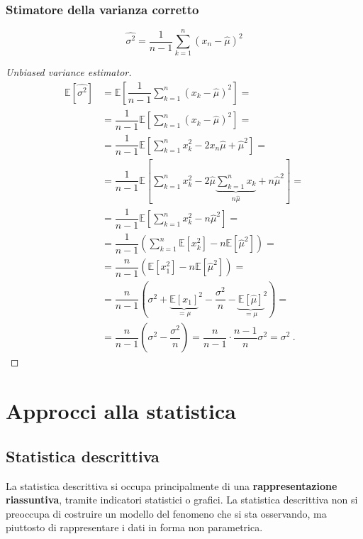 \subsection{Stimatore della varianza corretto}
\begin{equation}
    \widehat{\sigma^2} = \dfrac{1}{n-1} \sum_{k=1}^{n} ( x_n - \hat{\mu} )^2
\end{equation}
\begin{proof}[Unbiased variance estimator]
\begin{equation}
\begin{aligned}
    \mathbb{E}\left[\widehat{\sigma^2}\right]
    & = \mathbb{E}\left[\dfrac{1}{n-1} \sum_{k=1}^n (x_k - \widehat{\mu} )^2 \right] = \\
    & = \dfrac{1}{n-1} \mathbb{E}\left[ \sum_{k=1}^n (x_k - \widehat{\mu} )^2 \right] = \\
    & = \dfrac{1}{n-1} \mathbb{E}\left[ \sum_{k=1}^n x_k^2 - 2 x_n \widehat{\mu} + \widehat{\mu}^2 \right] = \\
    & = \dfrac{1}{n-1} \mathbb{E}\left[ \sum_{k=1}^n x_k^2 - 2\widehat{\mu} \underbrace{\sum_{k=1}^n x_k}_{n \widehat{\mu}} +  n \widehat{\mu}^2 \right] = \\
    & = \dfrac{1}{n-1} \mathbb{E}\left[ \sum_{k=1}^n x_k^2 - n \widehat{\mu}^2  \right] = \\
    & = \dfrac{1}{n-1} \left( \sum_{k=1}^n \mathbb{E}[x_k^2] - n \mathbb{E}[\widehat{\mu}^2]  \right) = \\
    & = \dfrac{n}{n-1} \left( \mathbb{E}[x_1^2] - n \mathbb{E}[\widehat{\mu}^2]  \right) = \\
    & = \dfrac{n}{n-1} \left( \sigma^2 + {\underbrace{\mathbb{E}[x_1]}_{=\mu}}^2 - \dfrac{\sigma^2}{n} -  {\underbrace{\mathbb{E}[\widehat{\mu}]}_{=\mu}}^2 \right) = \\
    & = \dfrac{n}{n-1} \left( \sigma^2 - \dfrac{\sigma^2}{n}  \right) = \dfrac{n}{n-1}\cdot\dfrac{n-1}{n} \sigma^2 = \sigma^2 \ .
\end{aligned}
\end{equation}
\end{proof}

\chapter{Approcci alla statistica}
\section{Statistica descrittiva}
\begin{definition}
La statistica descrittiva si occupa principalmente di una \textbf{rappresentazione riassuntiva}, tramite indicatori statistici o grafici.
La statistica descrittiva non si preoccupa di costruire un modello del fenomeno che si sta osservando, ma piuttosto di rappresentare i dati in forma non parametrica.
\end{definition}

